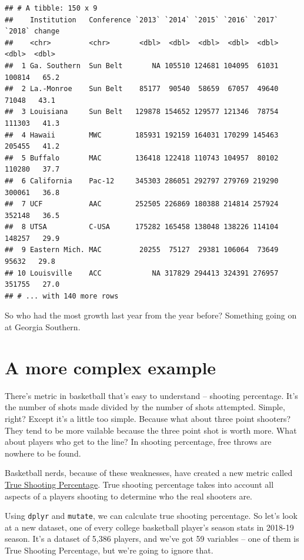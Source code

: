 \documentclass[
]{book}
\begin{document}
\begin{verbatim}
## # A tibble: 150 x 9
##    Institution   Conference `2013` `2014` `2015` `2016` `2017` `2018` change
##    <chr>         <chr>       <dbl>  <dbl>  <dbl>  <dbl>  <dbl>  <dbl>  <dbl>
##  1 Ga. Southern  Sun Belt       NA 105510 124681 104095  61031 100814   65.2
##  2 La.-Monroe    Sun Belt    85177  90540  58659  67057  49640  71048   43.1
##  3 Louisiana     Sun Belt   129878 154652 129577 121346  78754 111303   41.3
##  4 Hawaii        MWC        185931 192159 164031 170299 145463 205455   41.2
##  5 Buffalo       MAC        136418 122418 110743 104957  80102 110280   37.7
##  6 California    Pac-12     345303 286051 292797 279769 219290 300061   36.8
##  7 UCF           AAC        252505 226869 180388 214814 257924 352148   36.5
##  8 UTSA          C-USA      175282 165458 138048 138226 114104 148257   29.9
##  9 Eastern Mich. MAC         20255  75127  29381 106064  73649  95632   29.8
## 10 Louisville    ACC            NA 317829 294413 324391 276957 351755   27.0
## # ... with 140 more rows
\end{verbatim}

So who had the most growth last year from the year before? Something going on at Georgia Southern.

\hypertarget{a-more-complex-example}{%
\section{A more complex example}\label{a-more-complex-example}}

There's metric in basketball that's easy to understand -- shooting percentage. It's the number of shots made divided by the number of shots attempted. Simple, right? Except it's a little too simple. Because what about three point shooters? They tend to be more vailable because the three point shot is worth more. What about players who get to the line? In shooting percentage, free throws are nowhere to be found.

Basketball nerds, because of these weaknesses, have created a new metric called \href{https://en.wikipedia.org/wiki/True_shooting_percentage}{True Shooting Percentage}. True shooting percentage takes into account all aspects of a players shooting to determine who the real shooters are.

Using \texttt{dplyr} and \texttt{mutate}, we can calculate true shooting percentage. So let's look at a new dataset, one of every college basketball player's season stats in 2018-19 season. It's a dataset of 5,386 players, and we've got 59 variables -- one of them is True Shooting Percentage, but we're going to ignore that.
\end{document}

